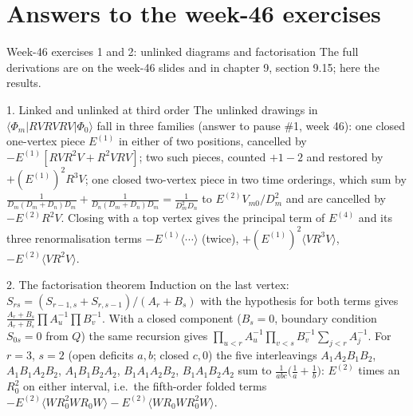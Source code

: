 \documentclass[aspectratio=169,10pt]{beamer}
\newcommand{\mel}[3]{\langle #1\lvert #2\rvert #3\rangle}
\newcommand{\ph}{\Phi_0}
\begin{document}
\section{Answers to the week-46 exercises}

\begin{frame}[shrink=3]{Week-46 exercises 1 and 2: unlinked diagrams and factorisation}
\small
The full derivations are on the week-46 slides and in chapter 9, section 9.15; here the results.
\begin{block}{1. Linked and unlinked at third order}
The unlinked drawings in $\mel{\Phi_m}{RVRVRV}{\ph}$ fall in three families (answer to pause \#1, week 46): one closed one-vertex piece $E^{(1)}$ in either of two positions, cancelled by $-E^{(1)}[RVR^2V+R^2VRV]$; two such pieces, counted $+1-2$ and restored by $+(E^{(1)})^2R^3V$; one closed two-vertex piece in two time orderings, which sum by
$\frac1{D_m(D_m+D_n)D_m}+\frac1{D_n(D_m+D_n)D_m}=\frac1{D_m^2D_n}$ to $E^{(2)}V_{m0}/D_m^2$ and are cancelled by $-E^{(2)}R^2V$. Closing with a top vertex gives the principal term of $E^{(4)}$ and its three renormalisation terms $-E^{(1)}\langle\cdots\rangle$ (twice), $+(E^{(1)})^2\langle VR^3V\rangle$, $-E^{(2)}\langle VR^2V\rangle$.
\end{block}
\begin{block}{2. The factorisation theorem}
Induction on the last vertex: $S_{rs}=(S_{r-1,s}+S_{r,s-1})/(A_r+B_s)$ with the hypothesis for both terms gives $\frac{A_r+B_s}{A_r+B_s}\prod A_u^{-1}\prod B_v^{-1}$. With a closed component ($B_s=0$, boundary condition $S_{0s}=0$ from $Q$) the same recursion gives $\prod_{u<r}A_u^{-1}\prod_{v<s}B_v^{-1}\sum_{j<r}A_j^{-1}$. For $r=3$, $s=2$ (open deficits $a,b$; closed $c,0$) the five interleavings $A_1A_2B_1B_2$, $A_1B_1A_2B_2$, $A_1B_1B_2A_2$, $B_1A_1A_2B_2$, $B_1A_1B_2A_2$ sum to $\frac1{abc}\bigl(\frac1a+\frac1b\bigr)$: $E^{(2)}$ times an $R_0^2$ on either interval, i.e.\ the fifth-order folded terms $-E^{(2)}\langle WR_0^2WR_0W\rangle-E^{(2)}\langle WR_0WR_0^2W\rangle$.
\end{block}
\end{frame}
\end{document}
